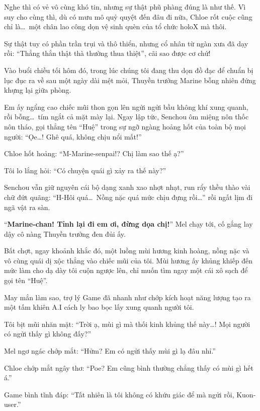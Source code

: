 \documentclass[../main.tex]{subfiles}
\begin{document}
Nghe thì có vẻ vô cùng khó tin, nhưng sự thật phũ phàng đúng là như thế. Vì suy cho cùng thì, dù có mưu mô quỷ quyệt đến đâu đi nữa, Chloe rốt cuộc cũng chỉ là\dots\ một chân lao công dọn vệ sinh quèn của tổ chức holoX mà thôi.

Sự thật tuy có phần trần trụi và thô thiển, nhưng cổ nhân từ ngàn xưa đã dạy rồi: ``Thẳng thắn thật thà thường thua thiệt'', cãi sao được cơ chứ!

\omk

Vào buổi chiều tối hôm đó, trong lúc chúng tôi đang thu dọn đồ đạc để chuẩn bị lục đục ra về sau một ngày dài mệt mỏi, Thuyền trưởng Marine bỗng nhiên đứng khựng lại giữa phòng.

Em ấy ngẩng cao chiếc mũi thon gọn lên ngửi ngửi bầu không khí xung quanh, rồi bỗng\dots\ tím ngắt cả mặt mày lại. Ngay lập tức, Senchou ôm miệng nôn thốc nôn tháo, gọi thẳng tên ``Huệ'' trong sự ngỡ ngàng hoảng hốt của toàn bộ mọi người: ``Ọe\dots! Ghê quá, không chịu nổi mất!''

Chloe hốt hoảng: ``M-Marine-senpai!? Chị làm sao thế ạ?''

Tôi lo lắng hỏi: ``Có chuyện quái gì xảy ra thế này?''

Senchou vẫn giữ nguyên cái bộ dạng xanh xao nhợt nhạt, run rẩy thều thào vài chữ đứt quãng: ``H-Hôi quá\dots\ Nồng nặc quá mức chịu đựng rồi\dots'' rồi ngất lịm đi ngã vật ra sàn.

``\textbf{Marine-chan! Tỉnh lại đi em ơi, đừng dọa chị!}'' Mel chạy tới, cố gắng lay dậy cô nàng Thuyền trưởng đen đủi ấy.

Bất chợt, ngay khoảnh khắc đó, một luồng mùi hương kinh hoàng, nồng nặc và vô cùng quái dị xộc thẳng vào chiếc mũi của tôi. Mùi hương ấy khủng khiếp đến mức làm cho dạ dày tôi cuộn ngược lên, chỉ muốn tìm ngay một cái xô sạch để gọi tên ``Huệ''.

May mắn làm sao, trợ lý Game đã nhanh như chớp kích hoạt năng lượng tạo ra một tấm khiên A.I cách ly bao bọc lấy xung quanh người tôi.

Tôi bịt mũi nhăn mặt: ``Trời ạ, mùi gì mà thối kinh khủng thế này\dots! Mọi người có ngửi thấy gì không đấy?''

Mel ngơ ngác chớp mắt: ``Hửm? Em có ngửi thấy mùi gì lạ đâu nhỉ.''

Chloe chớp mắt ngây thơ: ``Poe? Em cũng bình thường chẳng thấy có mùi gì hết á.''

Game bình tĩnh đáp: ``Tất nhiên là tôi không có khứu giác để mà ngửi rồi, Kuon-user.''
\end{document}

